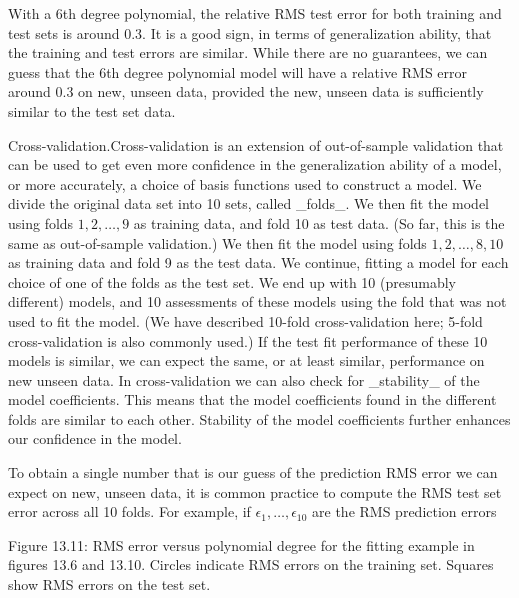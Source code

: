 With a 6th degree polynomial, the relative RMS test error for both training and test sets is around 0.3. It is a good sign, in terms of generalization ability, that the training and test errors are similar. While there are no guarantees, we can guess that the 6th degree polynomial model will have a relative RMS error around 0.3 on new, unseen data, provided the new, unseen data is sufficiently similar to the test set data.

Cross-validation.Cross-validation is an extension of out-of-sample validation that can be used to get even more confidence in the generalization ability of a model, or more accurately, a choice of basis functions used to construct a model. We divide the original data set into 10 sets, called _folds_. We then fit the model using folds \(1,2,\ldots,9\) as training data, and fold 10 as test data. (So far, this is the same as out-of-sample validation.) We then fit the model using folds \(1,2,\ldots,8,10\) as training data and fold 9 as the test data. We continue, fitting a model for each choice of one of the folds as the test set. We end up with 10 (presumably different) models, and 10 assessments of these models using the fold that was not used to fit the model. (We have described 10-fold cross-validation here; 5-fold cross-validation is also commonly used.) If the test fit performance of these 10 models is similar, we can expect the same, or at least similar, performance on new unseen data. In cross-validation we can also check for _stability_ of the model coefficients. This means that the model coefficients found in the different folds are similar to each other. Stability of the model coefficients further enhances our confidence in the model.

To obtain a single number that is our guess of the prediction RMS error we can expect on new, unseen data, it is common practice to compute the RMS test set error across all 10 folds. For example, if \(\epsilon_{1},\ldots,\epsilon_{10}\) are the RMS prediction errors

Figure 13.11: RMS error versus polynomial degree for the fitting example in figures 13.6 and 13.10. Circles indicate RMS errors on the training set. Squares show RMS errors on the test set.

 